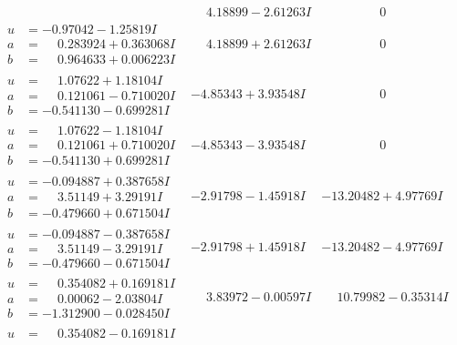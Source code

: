 \documentclass[1p]{elsarticle_modified}
\theoremstyle{definition}
\begin{document}
$$\begin{array}{c|c|c}
 & \phantom{-}4.18899 - 2.61263 I & \phantom{-0.000000 } 0 \\ \hline\begin{aligned}
u &= -0.97042 - 1.25819 I \\
a &= \phantom{-}0.283924 + 0.363068 I \\
b &= \phantom{-}0.964633 + 0.006223 I\end{aligned}
 & \phantom{-}4.18899 + 2.61263 I & \phantom{-0.000000 } 0 \\ \hline\begin{aligned}
u &= \phantom{-}1.07622 + 1.18104 I \\
a &= \phantom{-}0.121061 - 0.710020 I \\
b &= -0.541130 - 0.699281 I\end{aligned}
 & -4.85343 + 3.93548 I & \phantom{-0.000000 } 0 \\ \hline\begin{aligned}
u &= \phantom{-}1.07622 - 1.18104 I \\
a &= \phantom{-}0.121061 + 0.710020 I \\
b &= -0.541130 + 0.699281 I\end{aligned}
 & -4.85343 - 3.93548 I & \phantom{-0.000000 } 0 \\ \hline\begin{aligned}
u &= -0.094887 + 0.387658 I \\
a &= \phantom{-}3.51149 + 3.29191 I \\
b &= -0.479660 + 0.671504 I\end{aligned}
 & -2.91798 - 1.45918 I & -13.20482 + 4.97769 I \\ \hline\begin{aligned}
u &= -0.094887 - 0.387658 I \\
a &= \phantom{-}3.51149 - 3.29191 I \\
b &= -0.479660 - 0.671504 I\end{aligned}
 & -2.91798 + 1.45918 I & -13.20482 - 4.97769 I \\ \hline\begin{aligned}
u &= \phantom{-}0.354082 + 0.169181 I \\
a &= \phantom{-}0.00062 - 2.03804 I \\
b &= -1.312900 - 0.028450 I\end{aligned}
 & \phantom{-}3.83972 - 0.00597 I & \phantom{-}10.79982 - 0.35314 I \\ \hline\begin{aligned}
u &= \phantom{-}0.354082 - 0.169181 I \\

\end{aligned}
\end{array}$$
\end{document}
